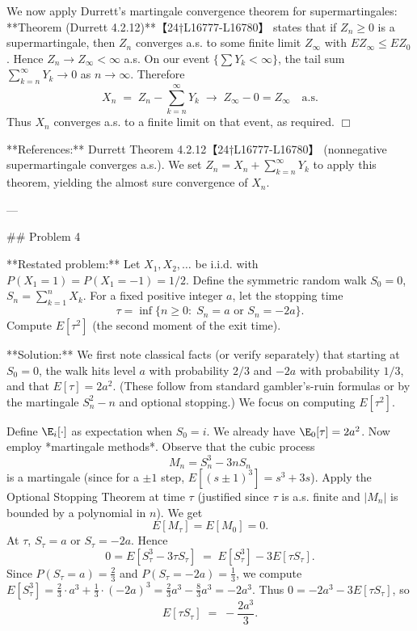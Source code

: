\documentclass[11pt]{article}
\begin{document}
We now apply Durrett’s martingale convergence theorem for supermartingales: **Theorem (Durrett 4.2.12)**【24†L16777-L16780】 states that if $Z_n\ge0$ is a supermartingale, then $Z_n$ converges a.s. to some finite limit $Z_\infty$ with $EZ_\infty \le EZ_0$. Hence $Z_n\to Z_\infty<\infty$ a.s. On our event $\{\sum Y_k<\infty\}$, the tail sum $\sum_{k=n}^\infty Y_k \to0$ as $n\to\infty$. Therefore
\[
X_n \;=\; Z_n - \sum_{k=n}^\infty Y_k \;\longrightarrow\; Z_\infty - 0 = Z_\infty
\quad\text{a.s.}
\]
Thus $X_n$ converges a.s. to a finite limit on that event, as required. $\Box$

**References:** Durrett Theorem 4.2.12【24†L16777-L16780】 (nonnegative supermartingale converges a.s.). We set $Z_n=X_n+\sum_{k=n}^\infty Y_k$ to apply this theorem, yielding the almost sure convergence of $X_n$.

---

\#\# Problem 4

**Restated problem:** Let $X_1,X_2,\dots$ be i.i.d. with $P(X_1=1)=P(X_1=-1)=1/2$. Define the symmetric random walk $S_0=0$, $S_n = \sum_{k=1}^n X_k$. For a fixed positive integer $a$, let the stopping time
\[
\tau = \inf\{n\ge0:\;S_n = a \text{ or } S_n = -2a\}.
\]
Compute $E[\tau^2]$ (the second moment of the exit time).

**Solution:** We first note classical facts (or verify separately) that starting at $S_0=0$, the walk hits level $a$ with probability $2/3$ and $-2a$ with probability $1/3$, and that $E[\tau] = 2a^2$. (These follow from standard gambler’s-ruin formulas or by the martingale $S_n^2-n$ and optional stopping.) We focus on computing $E[\tau^2]$.

Define $\E_i[\cdot]$ as expectation when $S_0=i$. We already have $\E_0[\tau]=2a^2$. Now employ *martingale methods*. Observe that the cubic process
\[
M_n = S_n^3 - 3n S_n
\]
is a martingale (since for a $\pm1$ step, $E[(s\pm1)^3] = s^3 + 3s$). Apply the Optional Stopping Theorem at time $\tau$ (justified since $\tau$ is a.s. finite and $|M_n|$ is bounded by a polynomial in $n$). We get
\[
E[M_\tau] = E[M_0] = 0.
\]
At $\tau$, $S_\tau=a$ or $S_\tau=-2a$. Hence
\[
0 = E[S_\tau^3 - 3\tau S_\tau] \;=\; E[S_\tau^3] - 3E[\tau S_\tau].
\]
Since $P(S_\tau=a)=\tfrac23$ and $P(S_\tau=-2a)=\tfrac13$, we compute
$E[S_\tau^3] = \tfrac23\cdot a^3 + \tfrac13\cdot(-2a)^3 = \frac23 a^3 - \frac{8}{3}a^3 = -2a^3$.
Thus $0 = -2a^3 -3E[\tau S_\tau]$, so
\[
E[\tau S_\tau] \;=\; -\frac{2a^3}{3}.
\]
\end{document}
